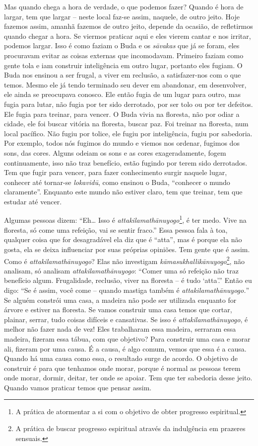 Mas quando chega a hora de verdade, o que podemos fazer? Quando é
hora de largar, tem que largar – neste local faz-se assim, naquele, de
outro jeito. Hoje fazemos assim, amanhã fazemos de outro jeito, depende
da ocasião, de refletirmos quando chegar a hora. Se viermos praticar
aqui e eles vierem cantar e nos irritar, podemos largar. Isso é como
faziam o Buda e os \textit{sāvakas} que já se foram, eles procuravam
evitar as coisas externas que incomodavam. Primeiro faziam como gente
tola e iam construir inteligência em outro lugar, portanto eles fugiam.
O Buda nos ensinou a ser frugal, a viver em reclusão, a satisfazer-nos
com o que temos. Mesmo ele já tendo terminado seu dever em abandonar,
em desenvolver, ele ainda se preocupava conosco. Ele então fugia de um
lugar para outro, mas fugia para lutar, não fugia por ter sido
derrotado, por ser tolo ou por ter defeitos. Ele fugia para treinar,
para vencer. O Buda vivia na floresta, não por odiar a cidade, ele foi
buscar vitória na floresta, buscar paz. Foi treinar na floresta, num
local pacífico. Não fugiu por tolice, ele fugiu por inteligência, fugiu
por sabedoria. Por exemplo, todos nós fugimos do mundo e viemos nos
ordenar, fugimos dos sons, das cores. Alguns odeiam os sons e as cores
exageradamente, fogem continuamente, isso não traz benefício, estão
fugindo por terem sido derrotados. Tem que fugir para vencer, para
fazer conhecimento surgir naquele lugar, conhecer até tornar-se
\textit{lokavidū}, como ensinou o Buda, “conhecer o mundo
claramente”. Enquanto este mundo não estiver claro, tem que treinar,
tem que estudar até vencer. 

Algumas pessoas dizem: “Eh… Isso é
\textit{attakilamathānuyogo}\footnote{A prática de atormentar a si
com o objetivo de obter progresso espiritual.}, é ter medo. Vive na
floresta, só come uma refeição, vai se sentir fraco.” Essa pessoa fala
à toa, qualquer coisa que for desagradável ela diz que é “atta”, mas é
porque ela não gosta, ela se deixa influenciar por suas próprias
opiniões. Tem gente que é assim. Como é \textit{attakilamathānuyogo}?
Elas não investigam \textit{kāmasukhallikānuyogo}\footnote{A
prática de buscar progresso espiritual através da indulgência em
prazeres sensuais.}, não analisam, só analisam
\textit{attakilamathānuyogo}: “Comer uma só refeição não traz
benefício algum. Frugalidade, reclusão, viver na floresta – é tudo
‘atta’.” Então eu digo: “Se é assim, você come – quando mastiga também
é \textit{attakilamathānuyogo.}” Se alguém constrói uma casa, a
madeira não pode ser utilizada enquanto for árvore e estiver na
floresta. Se vamos construir uma casa temos que cortar, plainar,
serrar, tudo coisas difíceis e cansativas. Se isso é
\textit{attakilamathānuyogo}, é melhor não fazer nada de vez! Eles
trabalharam essa madeira, serraram essa madeira, fizeram essa tábua,
com que objetivo? Para construir uma casa e morar ali, fizeram por uma
causa. É a causa, é algo comum, vemos que essa é a causa. Quando há uma
causa como essa, o resultado surge de acordo. O objetivo de construir é
para que tenhamos onde morar, porque é normal as pessoas terem onde
morar, dormir, deitar, ter onde se apoiar. Tem que ter sabedoria desse
jeito. Quando vamos praticar temos que pensar assim. 

